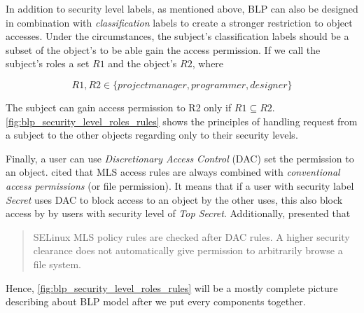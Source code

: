 
In addition to security level labels, as mentioned above, BLP can also be designed in combination with \emph{classification} labels to create a stronger restriction to object accesses.
Under the circumstances, the subject's classification labels should be a subset of the object's to be able gain the access permission.
If we call the subject's roles a set $R1$ and the object's $R2$, where

$$R1, R2 \in \{project manager, programmer, designer\}$$ 

The subject can gain access permission to R2 only if $R1 \subseteq R2$.
\autoref{fig:blp_security_level_roles_rules} shows the principles of handling request from a subject to the other objects regarding only to their security levels.


Finally, a user can use \emph{Discretionary Access Control} (DAC) set the permission to an object.
\cite{centos:2008} cited that MLS access rules are always combined with \emph{conventional access permissions} (or file permission).
It means that if a user with security label \emph{Secret} uses DAC to block access to an object by the other uses, this also block access by by users with security level of \emph{Top Secret}.
Additionally, \cite{bancinco:2015} presented that
\begin{quote}
SELinux MLS policy rules are checked after DAC rules. A higher security clearance does not automatically give permission to arbitrarily browse a file system.
\end{quote}
Hence, \autoref{fig:blp_security_level_roles_rules} will be a mostly complete picture describing about BLP model after we put every components together.

